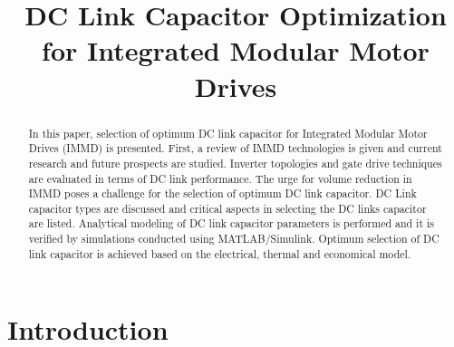 \documentclass[conference,a4paper,twocolumn]{IEEEtran}
\begin{document}
\title{DC Link Capacitor Optimization for Integrated Modular Motor Drives}
\author{
\and
{}
}
\maketitle


\begin{abstract}
In this paper, selection of optimum DC link capacitor for Integrated Modular Motor Drives (IMMD) is presented. First, a review of IMMD technologies is given and current research and future prospects are studied. Inverter topologies and gate drive techniques are evaluated in terms of DC link performance. The urge for volume reduction in IMMD poses a challenge for the selection of optimum DC link capacitor. DC Link capacitor types are discussed and critical aspects in selecting the DC links capacitor are listed. Analytical modeling of DC link capacitor parameters is performed and it is verified by simulations conducted using MATLAB/Simulink. Optimum selection of DC link capacitor is achieved based on the electrical, thermal and economical model.
\end{abstract}


\IEEEpeerreviewmaketitle





\section{Introduction}
\end{document}
